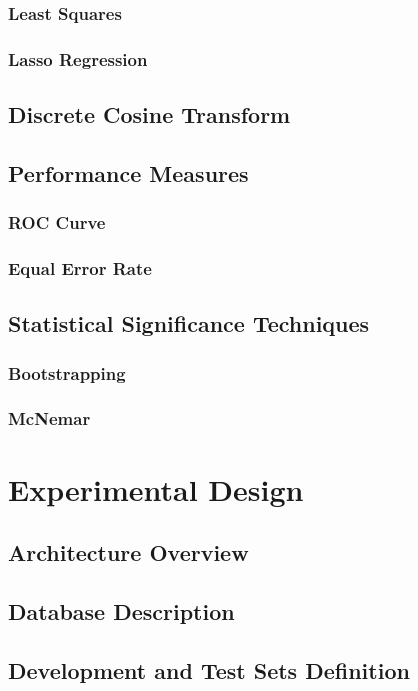 \documentclass[11pt,a4paper]{tesis}
\begin{document}
		\subsection{Least Squares}
		\subsection{Lasso Regression}
	\section{Discrete Cosine Transform}
	\section{Performance Measures}
		\subsection{ROC Curve}
		\subsection{Equal Error Rate}
			
	\section{Statistical Significance Techniques}
		\subsection{Bootstrapping}
		\subsection{McNemar}

\chapter{Experimental Design}
	\section{Architecture Overview}
		
	\section{Database Description}
	\section{Development and Test Sets Definition}
\end{document}
